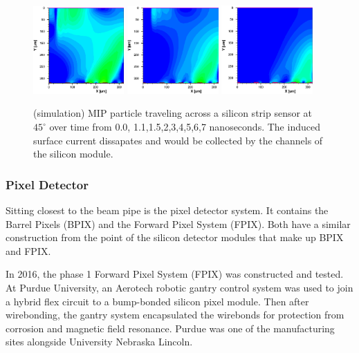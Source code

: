 \begin{figure}[ht!b]
  \includegraphics[width=0.31\textwidth]{figures/silicon/silicon_t5.0.png}
  \includegraphics[width=0.31\textwidth]{figures/silicon/silicon_t6.0.png}
  \includegraphics[width=0.31\textwidth]{figures/silicon/silicon_t7.0.png}\\
    \caption{\label{fig:sd} (simulation) MIP particle traveling across a silicon strip sensor at $45^\circ$ over time from 0.0, 1.1,1.5,2,3,4,5,6,7 nanoseconds. The induced surface current dissapates and would be collected by the channels of the silicon module.}
\end{figure}





\subsubsection{Pixel Detector}
Sitting closest to the beam pipe is the pixel detector system. It contains the Barrel Pixels (BPIX) and the Forward Pixel System (FPIX). Both have a similar construction from the point of the silicon detector modules that make up BPIX and FPIX. 

In 2016, the phase 1 Forward Pixel System (FPIX) was constructed and tested. At Purdue University, an Aerotech robotic gantry control system was used to join a hybrid flex circuit to a bump-bonded silicon pixel module. Then after wirebonding, the gantry system encapsulated the wirebonds for protection from corrosion and magnetic field resonance. Purdue was one of the manufacturing sites alongside University Nebraska Lincoln. 


